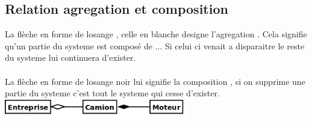 \documentclass[a4paper,12pt,openany]{book}
\begin{document}
\subsection{Relation agregation et composition}

La flèche en forme de losange , celle en blanche designe l'agregation . Cela signifie qu'un partie du systeme est composé de ... Si celui ci venait a disparaitre le reste du systeme lui continuera d'exister.\\
\\
La flèche en forme de losange noir lui signifie la composition , si on supprime une partie du systeme c'est tout le systeme qui cesse d'exister.\\
\includegraphics[width=0.60\textwidth,center]{img/relation_agregat_et_composition.png}
\end{document}
